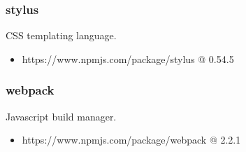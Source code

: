   \subsubsection{stylus}
  CSS templating language.
  \begin{itemize}
    \item https://www.npmjs.com/package/stylus @ 0.54.5
  \end{itemize}

  \subsubsection{webpack}
  Javascript build manager.
  \begin{itemize}
    \item https://www.npmjs.com/package/webpack @ 2.2.1
  \end{itemize}






